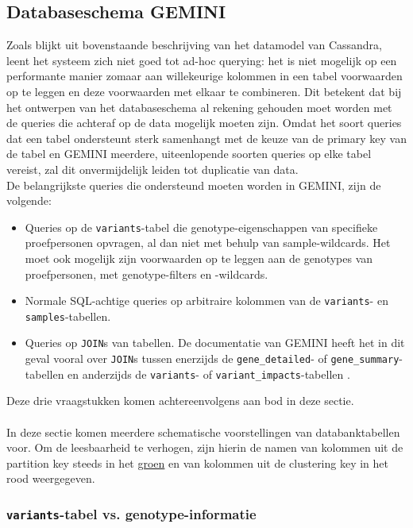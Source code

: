 \subsection{Databaseschema GEMINI}

Zoals blijkt uit bovenstaande beschrijving van het datamodel van Cassandra, leent het systeem zich niet goed tot ad-hoc querying: het is niet mogelijk op een performante manier zomaar aan willekeurige kolommen in een tabel voorwaarden op te leggen en deze voorwaarden met elkaar te combineren. Dit betekent dat bij het ontwerpen van het databaseschema al rekening gehouden moet worden met de queries die achteraf op de data mogelijk moeten zijn. Omdat het soort queries dat een tabel ondersteunt sterk samenhangt met de keuze van de primary key van de tabel en GEMINI meerdere, uiteenlopende soorten queries op elke tabel vereist, zal dit onvermijdelijk leiden tot duplicatie van data.\\
De belangrijkste queries die ondersteund moeten worden in GEMINI, zijn de volgende:
\begin{itemize}
\item Queries op de \texttt{variants}-tabel die genotype-eigenschappen van specifieke proefpersonen opvragen, al dan niet met behulp van sample-wildcards. Het moet ook mogelijk zijn voorwaarden op te leggen aan de genotypes van proefpersonen, met genotype-filters en -wildcards.
\item Normale SQL-achtige queries op arbitraire kolommen van de \texttt{variants}- en \texttt{samples}-tabellen.
\item Queries op \texttt{JOIN}s van tabellen. De documentatie van GEMINI heeft het in dit geval vooral over \texttt{JOIN}s tussen enerzijds de \texttt{gene\_detailed}- of \texttt{gene\_summary}-tabellen en anderzijds de \texttt{variants}- of \texttt{variant\_impacts}-tabellen \cite{gemini_joins}.
\end{itemize}
Deze drie vraagstukken komen achtereenvolgens aan bod in deze sectie.\\\\
In deze sectie komen meerdere schematische voorstellingen van databanktabellen voor. Om de leesbaarheid te verhogen, zijn hierin de namen van kolommen uit de partition key steeds in het {\color{ForestGreen} \underline{groen}} en van kolommen uit de clustering key in het {\color{red} rood} weergegeven.

\subsubsection{\texttt{variants}-tabel vs. genotype-informatie}

